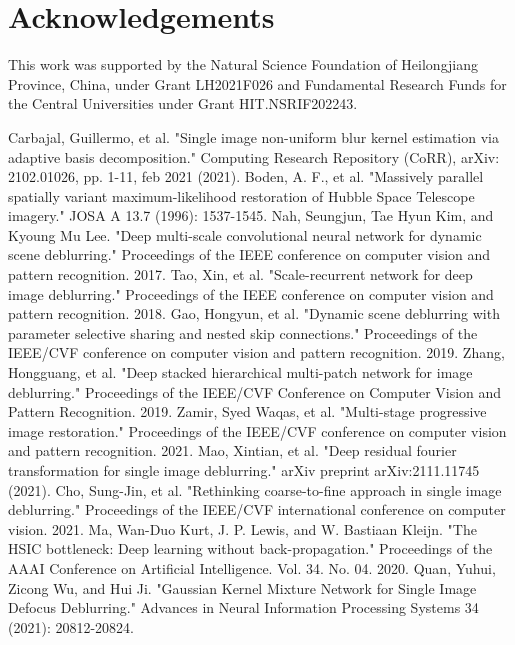 \begin{sloppypar}
\section*{Acknowledgements }
This work was supported by the Natural Science Foundation of Heilongjiang Province, China, under Grant LH2021F026 and Fundamental Research Funds for the Central Universities under Grant HIT.NSRIF202243.


%
%
\begin{thebibliography}{27}
	Carbajal, Guillermo, et al. "Single image non-uniform blur kernel estimation via adaptive basis decomposition." Computing Research Repository (CoRR), arXiv: 2102.01026, pp. 1-11, feb 2021 (2021).
	Boden, A. F., et al. "Massively parallel spatially variant maximum-likelihood restoration of Hubble Space Telescope imagery." JOSA A 13.7 (1996): 1537-1545.
	Nah, Seungjun, Tae Hyun Kim, and Kyoung Mu Lee. "Deep multi-scale convolutional neural network for dynamic scene deblurring." Proceedings of the IEEE conference on computer vision and pattern recognition. 2017.
	Tao, Xin, et al. "Scale-recurrent network for deep image deblurring." Proceedings of the IEEE conference on computer vision and pattern recognition. 2018.
	Gao, Hongyun, et al. "Dynamic scene deblurring with parameter selective sharing and nested skip connections." Proceedings of the IEEE/CVF conference on computer vision and pattern recognition. 2019.
	Zhang, Hongguang, et al. "Deep stacked hierarchical multi-patch network for image deblurring." Proceedings of the IEEE/CVF Conference on Computer Vision and Pattern Recognition. 2019.
	Zamir, Syed Waqas, et al. "Multi-stage progressive image restoration." Proceedings of the IEEE/CVF conference on computer vision and pattern recognition. 2021.
	Mao, Xintian, et al. "Deep residual fourier transformation for single image deblurring." arXiv preprint arXiv:2111.11745 (2021).
	Cho, Sung-Jin, et al. "Rethinking coarse-to-fine approach in single image deblurring." Proceedings of the IEEE/CVF international conference on computer vision. 2021.
	Ma, Wan-Duo Kurt, J. P. Lewis, and W. Bastiaan Kleijn. "The HSIC bottleneck: Deep learning without back-propagation." Proceedings of the AAAI Conference on Artificial Intelligence. Vol. 34. No. 04. 2020.
	Quan, Yuhui, Zicong Wu, and Hui Ji. "Gaussian Kernel Mixture Network for Single Image Defocus Deblurring." Advances in Neural Information Processing Systems 34 (2021): 20812-20824.

\end{thebibliography}
\end{sloppypar}
